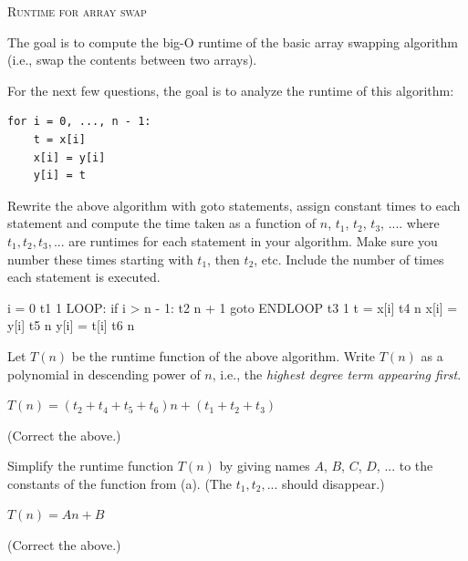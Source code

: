 

\LATEXHELPTHREEFIVEZERO

\TURNPAGE

\newpage
\textsc{Runtime for array swap}

The goal is to compute the big-O runtime of the basic array
swapping algorithm (i.e., swap the contents between two arrays).

For the next few questions,
the goal is to analyze the runtime of this algorithm:
\begin{Verbatim}[frame=single]
for i = 0, ..., n - 1:
    t = x[i]
    x[i] = y[i]
    y[i] = t
\end{Verbatim}

\nextq
Rewrite the above algorithm with
goto statements, assign constant times to each statement and
compute the time taken as a function of $n$, $t_1$, $t_2$, $t_3$, ....
where $t_1, t_2, t_3, ...$ are runtimes for each statement in your
algorithm. Make sure you
number these times starting with $t_1$, then
$t_2$, etc.
Include the number of times each statement is executed.
\\
\ANSWER
\begin{answercode}
          i = 0                   t1      1
LOOP:     if i > n - 1:           t2      n + 1
              goto ENDLOOP        t3      1
          t = x[i]                t4      n
          x[i] = y[i]             t5      n
          y[i] = t[i]             t6      n
\end{answercode}

\nextq
Let $T(n)$ be the runtime function of the above algorithm.
Write $T(n)$ as a polynomial in descending power of $n$, i.e.,
the \textit{highest degree term appearing first}.
\\
\ANSWER
\begin{answerlong}
$T(n) = (t_2 + t_4 + t_5 + t_6)n + (t_1 + t_2 + t_3)$
\end{answerlong}
(Correct the above.)

\nextq
Simplify the runtime function $T(n)$
by giving names $A$, $B$, $C$, $D$, ...
to the constants of the function from (a). (The $t_1, t_2, ...$ should
disappear.)
\\
\ANSWER
\begin{answerlong}
$T(n) = An + B$
\end{answerlong}
(Correct the above.)

